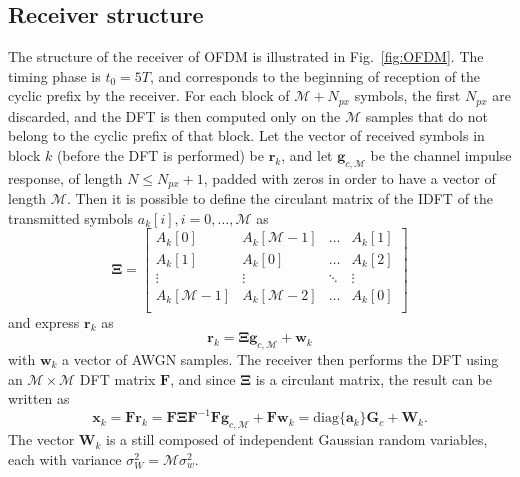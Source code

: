 \documentclass[10pt]{article}
\newcommand{\ofdM} {\mathcal{M}}
\newcommand{\DFTmat} {\mathcal{\mathbf{F}}}
\begin{document}
\subsection*{Receiver structure}
The structure of the receiver of OFDM is illustrated in Fig.~\ref{fig:OFDM}. The timing phase is $t_0 = 5 T$, and corresponds to the beginning of reception of the cyclic prefix by the receiver. For each block of $\ofdM + N_{px}$ symbols, the first $N_{px}$ are discarded, and the DFT is then computed only on the $\ofdM$ samples that do not belong to the cyclic prefix of that block. Let the vector of received symbols in block $k$ (before the DFT is performed) be $\mathbf{r}_k$, and let $\mathbf{g}_{c,\ofdM}$ be the channel impulse response, of length $N \le N_{px} + 1$, padded with zeros in order to have a vector of length $\ofdM$. Then it is possible to define the circulant matrix of the IDFT of the transmitted symbols $a_k[i], i = 0, \dots, \ofdM$ as
\begin{equation}
	\boldsymbol{\Xi} = 
	\begin{bmatrix}
		A_k[0] & A_k[\ofdM - 1] & \dots & A_k[1] \\
		A_k[1] & A_k[0] & \dots & A_k[2] \\
		\vdots & \vdots & \ddots & \vdots \\
		A_k[\ofdM - 1] & A_k[\ofdM - 2] & \dots & A_k[0] \\
	\end{bmatrix}
\end{equation}
and express $\mathbf{r}_k$ as
\begin{equation}
	\mathbf{r}_k = \boldsymbol{\Xi} \mathbf{g}_{c,\ofdM} + \mathbf{w}_k
\end{equation}
with $\mathbf{w}_k$ a vector of AWGN samples. %
The receiver then performs the DFT using an $\ofdM \times \ofdM$ DFT matrix $\DFTmat$, and since $\boldsymbol{\Xi}$ is a circulant matrix, the result can be written as
\begin{equation}
	 \mathbf{x}_k = \DFTmat \mathbf{r}_k = \DFTmat \boldsymbol{\Xi} \DFTmat^{-1} \DFTmat \mathbf{g}_{c,\ofdM} + \DFTmat \mathbf{w}_k = \mathrm{diag}\{\mathbf{a}_k\} \mathbf{G}_c + \mathbf{W}_k.
\end{equation}
The vector $\mathbf{W}_k$ is a still composed of independent Gaussian random variables, each with variance $\sigma_W^2 = \ofdM \sigma_w^2$. 
\end{document}
